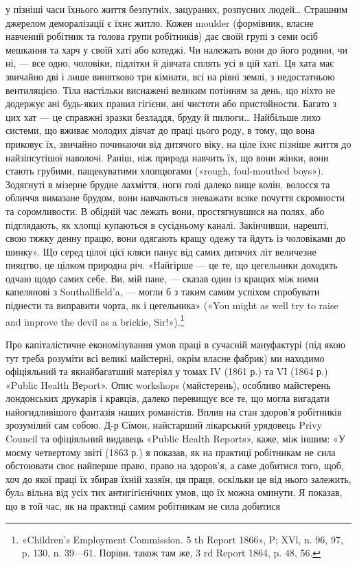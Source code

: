 \parcont{}  %
у пізніші часи їхнього життя безпутніх, зацураних, розпусних
людей\dots{} Страшним джерелом деморалізації є їхнє житло. Кожен
moulder (формівник, власне навчений робітник та голова групи
робітників) дає своїй групі з семи осіб мешкання та харч у своїй
хаті або котеджі. Чи належать вони до його родини, чи ні, — все
одно, чоловіки, підлітки й дівчата сплять усі в цій хаті. Ця хата
має звичайно дві і лише винятково три кімнати, всі на рівні землі,
з недостатньою вентиляцією. Тіла настільки виснажені великим
потінням за день, що ніхто не додержує ані будь-яких правил
гігієни, ані чистоти або пристойности. Багато з цих хат — це
справжні зразки безладдя, бруду й пилюги\dots{} Найбільше лихо
системи, що вживає молодих дівчат до праці цього роду, в тому,
що вона приковує їх, звичайно починаючи від дитячого віку, на
ціле їхнє пізніше життя до найзіпсутішої наволочі. Раніш, ніж
природа навчить їх, що вони жінки, вони стають грубими, пащекуватими
хлопцюгами («rough, foul-mouthed boys»). Зодягнуті
в мізерне брудне лахміття, ноги голі далеко вище колін, волосся
та обличчя вимазане брудом, вони навчаються зневажати всяке
почуття скромности та соромливости. В обідній час лежать вони,
простягнувшися на полях, або підглядають, як хлопці купаються
в сусідньому каналі. Закінчивши, нарешті, свою тяжку денну
працю, вони одягають кращу одежу та йдуть із чоловіками до
шинку». Що серед цілої цієї кляси панує від самих дитячих літ
величезне пияцтво, це цілком природна річ. «Найгірше — це те,
що цегельники доходять одчаю щодо самих себе. Ви, мій пане, —
сказав один із кращих між ними капелянові з Southallfield’a, —
могли б з таким самим успіхом спробувати піднести та виправити
чорта, як і цегельника» («You might as well try to raise and
improve the devil as a brickie, Sir!»).\footnote{
«Children’s Employment Commission. 5 th Report 1866», P; XVl,
n. 96, 97, p. 130, n. 39—61. Порівн. також там же, 3 rd Report 1864,
p. 48, 56.
}

Про капіталістичне економізування умов праці в сучасній
мануфактурі (під якою тут треба розуміти всі великі майстерні,
окрім власне фабрик) ми находимо офіціяльний та якнайбагатший
матеріял у томах IV (1861 р.) та VI (1864 р.) «Public Health Веport».
Опис workshops (майстерень), особливо майстерень лондонських
друкарів і кравців, далеко перевищує все те, що могла вигадати
найогидливішого фантазія наших романістів. Вплив на
стан здоров’я робітників зрозумілий сам собою. Д-р Сімон, найстарший
лікарський урядовець Privy Council та офіціяльний
видавець «Public Health Reports», каже, між іншим: «У моєму
четвертому звіті (1863 р.) я показав, як на практиці робітникам
не сила обстоювати своє найперше право, право на здоров’я,
а саме добитися того, щоб, хоч до якої праці їх збирав їхній хазяїн,
ця праця, оскільки це від нього залежить, булa вільна від
усіх тих антигігієнічних умов, що їх можна оминути. Я показав,
що в той час, як на практиці самим робітникам не сила добитися
\parbreak{}  %
